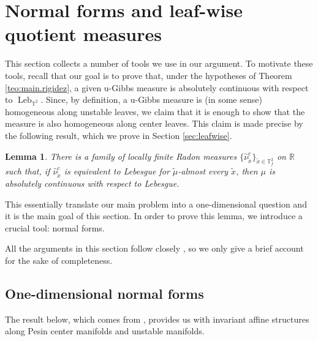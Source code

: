 \documentclass[a4paper,11pt,reqno]{amsart}
\newcommand{\TT}{{\mathbb{T}^2}}
\newcommand{\tix}{\tilde{x}}
\newtheorem{lemma}[theorem]{Lemma}
\theoremstyle{definition}
\begin{document}
\section{Normal forms and leaf-wise quotient measures}
\label{sec:normal}

This section collects a number of tools we use in our argument. To motivate these tools, recall that our goal is to prove that, under the hypotheses of Theorem \ref{teo:main.rigidez}, a given u-Gibbs measure is absolutely continuous with respect to $\operatorname{Leb}_{\TT}$. Since, by definition, a u-Gibbs measure is (in some sense) homogeneous along unstable leaves, we claim that it is enough to show that the measure is also homogeneous along center leaves. This claim is made precise by the following result, which we prove in Section \ref{sec:leafwise}.

\begin{lemma}
	\label{lem:temqueserlebesgue}
There is a family of locally finite Radon measures $\{\hat{\nu}^c_{\tix}\}_{\tix \in \mathbb{T}^2_f}$ on $\mathbb{R}$ such that, if $\hat{\nu}^c_{\tix}$ is equivalent to Lebesgue for $\tilde{\mu}$-almost every $\tix$, then $\mu$ is absolutely continuous with respect to Lebesgue.
\end{lemma}

This essentially translate our main problem into a one-dimensional question and it is the main goal of this section. In order to prove this lemma, we introduce a crucial tool: normal forms. 

All the arguments in this section follow closely \cite[Sections 6--7]{ALOS}, so we only give a brief account for the sake of completeness.

\subsection{One-dimensional normal forms}
The result below, which comes from \cite{KalininKatok}, provides us with invariant affine structures along Pesin center manifolds and unstable manifolds. 
\end{document}

